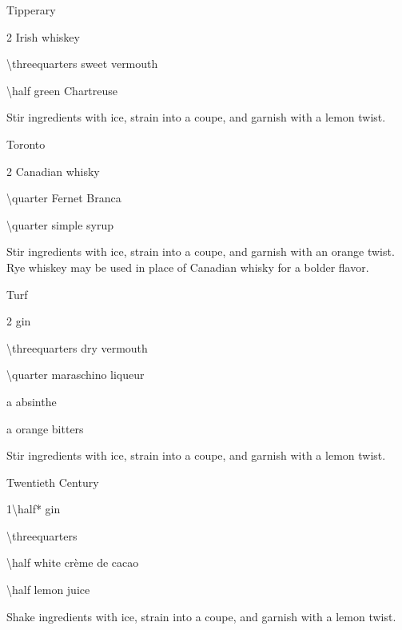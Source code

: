 \begin{Cocktail}{Tipperary}
	\begin{Ingredients}
	\item \SI{2}{\oz} Irish whiskey
	\item \SI{\threequarters}{\oz} sweet vermouth
	\item \SI{\half}{\oz} green Chartreuse
	\end{Ingredients}
	
	\begin{Instructions}
	Stir ingredients with ice, strain into a coupe, and garnish with a lemon twist.
	\end{Instructions}
\end{Cocktail}

\begin{Cocktail}{Toronto}
	\begin{Ingredients}
	\item \SI{2}{\oz} Canadian whisky
	\item \SI{\quarter}{\oz} Fernet Branca
	\item \SI{\quarter}{\oz} simple syrup
	\end{Ingredients}
	
	\begin{Instructions}
	Stir ingredients with ice, strain into a coupe, and garnish with an orange twist.  Rye whiskey may be used in place of Canadian whisky for a bolder flavor.
	\end{Instructions}
\end{Cocktail}

\begin{Cocktail}{Turf}
	\begin{Ingredients}
	\item \SI{2}{\oz} gin
	\item \SI{\threequarters}{\oz} dry vermouth
	\item \SI{\quarter}{\oz} maraschino liqueur
	\item a \si{\dash} absinthe
	\item a \si{\dash} orange bitters
	\end{Ingredients}
	
	\begin{Instructions}
	Stir ingredients with ice, strain into a coupe, and garnish with a lemon twist.
	\end{Instructions}
\end{Cocktail}

\begin{Cocktail}{Twentieth Century}
	\begin{Ingredients}
	\item \SI{1\half*}{\oz} gin
	\item \SI{\threequarters}{\oz} \Lillet
	\item \SI{\half}{\oz} white cr\`eme de cacao
	\item \SI{\half}{\oz} lemon juice
	\end{Ingredients}
	
	\begin{Instructions}
	Shake ingredients with ice, strain into a coupe, and garnish with a lemon twist.
	\end{Instructions}
\end{Cocktail}

